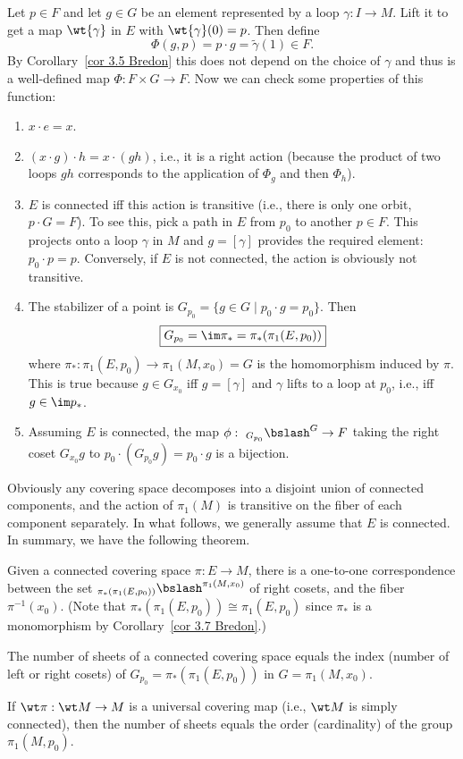 Let $p\in F$ and let $g\in G$ be an element represented by a loop $\gamma :I\to M$. Lift it to get a map $\wt{\gamma}$ in $E$ with $\wt{\gamma}(0)=p$. Then define
\[\Phi(g,p)=p\cdot g =\tilde{\gamma}(1) \in F.\]
By Corollary~\ref{cor 3.5 Bredon} this does not depend on the choice of $\gamma$ and thus is a well-defined map $\Phi:F\times G\to F$. Now we can check some properties of this function:
\begin{enumerate}
    \item $x\cdot e=x$.
    \item $(x\cdot g)\cdot h=x\cdot (gh)$, i.e., it is a right action (because the product of two loops $gh$ corresponds to the application of $\Phi_g$ and then $\Phi_h$).
    \item $E$ is connected iff this action is transitive (i.e., there is only one orbit, $p\cdot G=F$). To see this, pick a path in $E$ from $p_0$ to another $p\in F$. This projects onto a loop $\gamma$ in $M$ and $g=[\gamma]$ provides the required element: $p_0\cdot p=p$. Conversely, if $E$ is not connected, the action is obviously not transitive.
    \item The stabilizer of a point is $G_{p_0}=\{g\in G\mid p_0\cdot g=p_0\}$. Then 
    \[
        \boxed{G_{p_0}=\im \pi_\ast=\pi_\ast(\pi_1(E,p_0))}\label{stabilizer}
    \]
    where $\pi_\ast:\pi_1(E,p_0)\to \pi_1(M,x_0)=G$ is the homomorphism induced by $\pi$. This is true because $g\in G_{x_0}$ iff $g=[\gamma]$ and $\gamma$ lifts to a loop at $p_0$, i.e., iff $g\in \im p_\ast$.
    \item Assuming $E$ is connected, the map $\phi: \ _{G_{p_0}}\bslash^{G}\to F$ taking the right coset $G_{x_0}g$ to $p_0\cdot (G_{p_0}g)=p_0\cdot g$ is a bijection.
\end{enumerate}
Obviously any covering space decomposes into a disjoint union of connected components, and the action of $\pi_1(M)$ is transitive on the fiber of each component separately. In what follows, we generally assume that $E$ is connected. In summary, we have the following theorem.
\begin{thm}
    Given a connected covering space $\pi:E\to M$, there is a one-to-one correspondence between the set $_{\pi_\ast(\pi_1(E,p_0))}\bslash^{\pi_1(M,x_0)}$ of right cosets, and the fiber $\pi^{-1}(x_0)$. (Note that $\pi_\ast(\pi_1(E,p_0))\cong \pi_1(E,p_0)$ since $\pi_\ast$ is a monomorphism by Corollary~\ref{cor 3.7 Bredon}.)
\end{thm}
\begin{cor}
    The number of sheets of a connected covering space equals the index (number of left or right cosets) of $G_{p_0}=\pi_\ast(\pi_1(E,p_0))$ in $G=\pi_1(M,x_0)$.
\end{cor}
\begin{cor}
    If $\wt\pi:\wt M\to M$ is a universal covering map (i.e., $\wt M$ is simply connected), then the number of sheets equals the order (cardinality) of the group $\pi_1(M,p_0)$.
\end{cor}

